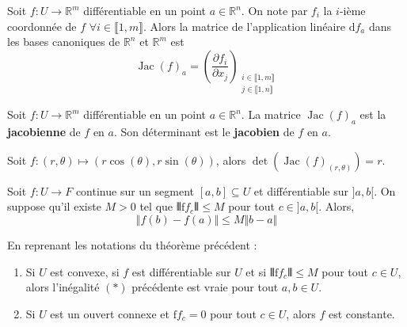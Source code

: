 
	\begin{corollary}
		Soit $f : U \rightarrow \mathbb{R}^m$ différentiable en un point $a \in \mathbb{R}^n$. On note par $f_i$ la $i$-ième coordonnée de $f$ $\forall i \in \llbracket 1, m \rrbracket$. Alors la matrice de l'application linéaire $\mathrm{d}f_a$ dans les bases canoniques de $\mathbb{R}^n$ et $\mathbb{R}^m$ est
		\[ \operatorname{Jac}(f)_a = \left( \frac{\partial f_i}{\partial x_j} \right)_{\substack{i \in \llbracket 1, m \rrbracket \\ j \in \llbracket 1, n \rrbracket}} \]
	\end{corollary}

	\begin{definition}
		Soit $f : U \rightarrow \mathbb{R}^m$ différentiable en un point $a \in \mathbb{R}^n$. La matrice $\operatorname{Jac}(f)_a$ est la \textbf{jacobienne} de $f$ en $a$. Son déterminant est le \textbf{jacobien} de $f$ en $a$.
	\end{definition}


	\begin{example}
		Soit $f : (r,\theta) \mapsto (r\cos(\theta), r\sin(\theta))$, alors $\det(\operatorname{Jac}(f)_{(r,\theta)}) = r$.
	\end{example}


	\begin{theorem}
		Soit $f : U \rightarrow F$ continue sur un segment $[a,b] \subseteq U$ et différentiable sur $]a,b[$. On suppose qu'il existe $M > 0$ tel que $\VERT \mathrm{f}f_c \VERT \leq M$ pour tout $c \in ]a,b[$. Alors,
		\[ \Vert f(b) - f(a) \Vert \leq M \Vert b - a \Vert \tag{$*$} \]
	\end{theorem}

	\begin{corollary}
		En reprenant les notations du théorème précédent :
		\begin{enumerate}[label=(\roman*)]
			\item Si $U$ est convexe, si $f$ est différentiable sur $U$ et si $\VERT \mathrm{f}f_c \VERT \leq M$ pour tout $c \in U$, alors l'inégalité $(*)$ précédente est vraie pour tout $a,b \in U$.
			\item Si $U$ est un ouvert connexe et $\mathrm{f}f_c = 0$ pour tout $c \in U$, alors $f$ est constante.
		\end{enumerate}
	\end{corollary}


